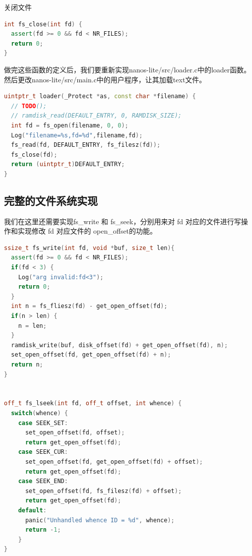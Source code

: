 \documentclass[UTF8,a4paper,10pt]{ctexart}
\begin{document}
关闭文件
\begin{lstlisting}[language = C++]
int fs_close(int fd) {
  assert(fd >= 0 && fd < NR_FILES);
  return 0;
}
\end{lstlisting}


做完这些函数的定义后，我们要重新实现nanos-lite/src/loader.c中的loader函数。然后更改nanos-lite/src/main.c中的用户程序，让其加载text文件。
\begin{lstlisting}[language = C++]
uintptr_t loader(_Protect *as, const char *filename) {
  // TODO();
  // ramdisk_read(DEFAULT_ENTRY, 0, RAMDISK_SIZE);
  int fd = fs_open(filename, 0, 0);
  Log("filename=%s,fd=%d",filename,fd);
  fs_read(fd, DEFAULT_ENTRY, fs_filesz(fd));
  fs_close(fd);
  return (uintptr_t)DEFAULT_ENTRY;
}
\end{lstlisting}

\subsection{完整的文件系统实现}
我们在这里还需要实现fs\_write 和 fs\_seek，分别用来对 fd 对应的文件进行写操作和实现修改 fd 对应文件的 open\_offset的功能。

\begin{lstlisting}[language = C++]
ssize_t fs_write(int fd, void *buf, size_t len){
  assert(fd >= 0 && fd < NR_FILES);
  if(fd < 3) {
    Log("arg invalid:fd<3");
    return 0;
  }
  int n = fs_fliesz(fd) - get_open_offset(fd);
  if(n > len) {
    n = len;
  }
  ramdisk_write(buf, disk_offset(fd) + get_open_offset(fd), n);
  set_open_offset(fd, get_open_offset(fd) + n);
  return n;
}


off_t fs_lseek(int fd, off_t offset, int whence) {
  switch(whence) {
    case SEEK_SET:
      set_open_offset(fd, offset);
      return get_open_offset(fd);
    case SEEK_CUR:
      set_open_offset(fd, get_open_offset(fd) + offset);
      return get_open_offset(fd);
    case SEEK_END:
      set_open_offset(fd, fs_filesz(fd) + offset);
      return get_open_offset(fd);
    default:
      panic("Unhandled whence ID = %d", whence);
      return -1;
    }
}
\end{lstlisting}
\end{document}
